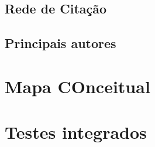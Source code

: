 \subsection{Rede de Citação}
\subsection{Principais autores}
\section{Mapa COnceitual}
\lipsum[1]

\section{Testes integrados}
\label{sec:testi}
\lipsum[1]







